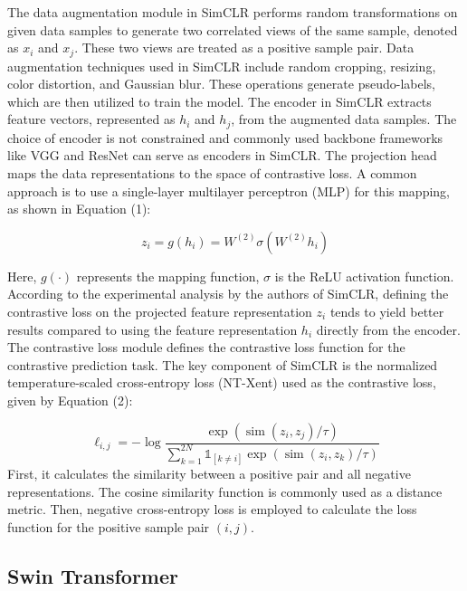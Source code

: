 \documentclass[10pt,twocolumn,letterpaper]{article}
\begin{document}
The data augmentation module in SimCLR performs random transformations on given data samples to generate two correlated views of the same sample, denoted as $x_i$ and $x_j$. These two views are treated as a positive sample pair. Data augmentation techniques used in SimCLR include random cropping, resizing, color distortion, and Gaussian blur. These operations generate pseudo-labels, which are then utilized to train the model.
The encoder in SimCLR extracts feature vectors, represented as $h_i$ and $h_j$, from the augmented data samples. The choice of encoder is not constrained and commonly used backbone frameworks like VGG and ResNet can serve as encoders in SimCLR.
The projection head maps the data representations to the space of contrastive loss. A common approach is to use a single-layer multilayer perceptron (MLP) for this mapping, as shown in Equation (1):

\begin{equation}
z_i=g\left(h_i\right)=W^{(2)} \sigma\left(W^{(2)} h_i\right)
\end{equation}

Here, $g(\cdot)$ represents the mapping function,  $\sigma$ is the ReLU activation function. According to the experimental analysis by the authors of SimCLR, defining the contrastive loss on the projected feature representation $z_i$ tends to yield better results compared to using the feature representation $h_i$ directly from the encoder.
The contrastive loss module defines the contrastive loss function for the contrastive prediction task. The key component of SimCLR is the normalized temperature-scaled cross-entropy loss (NT-Xent) used as the contrastive loss, given by Equation (2):

\begin{equation}
  \ell_{i, j}=-\log \frac{\exp \left(\operatorname{sim}\left(z_i, z_j\right) / \tau\right)}{\sum_{k=1}^{2 N} \mathbb{1}_{[k \neq i]} \exp \left(\operatorname{sim}\left(z_i, z_k\right) / \tau\right)}
\end{equation}
First, it calculates the similarity between a positive pair and all negative representations. The cosine similarity function is commonly used as a distance metric. Then, negative cross-entropy loss is employed to calculate the loss function for the positive sample pair $(i, j)$.



\subsection{Swin Transformer}
\end{document}
